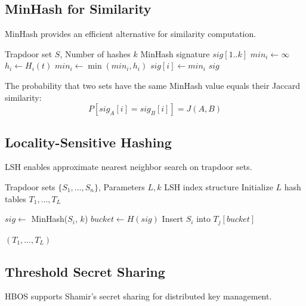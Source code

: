 \documentclass[../main_comprehensive.tex]{subfiles}
\begin{document}
\subsection{MinHash for Similarity}

MinHash provides an efficient alternative for similarity computation.

\begin{algorithm}
\caption{MinHash Signature Generation}
\label{alg:minhash}
\begin{algorithmic}[1]
\REQUIRE Trapdoor set $S$, Number of hashes $k$
\ENSURE MinHash signature $sig[1..k]$
  \STATE $min_i \leftarrow \infty$
    \STATE $h_i \leftarrow H_i(t)$ 
    \STATE $min_i \leftarrow \min(min_i, h_i)$
  \ENDFOR
  \STATE $sig[i] \leftarrow min_i$
\ENDFOR
\RETURN $sig$
\end{algorithmic}
\end{algorithm}

The probability that two sets have the same MinHash value equals their Jaccard similarity:
$$P[sig_A[i] = sig_B[i]] = J(A, B)$$

\subsection{Locality-Sensitive Hashing}

LSH enables approximate nearest neighbor search on trapdoor sets.

\begin{algorithm}
\caption{LSH Indexing}
\label{alg:lsh}
\begin{algorithmic}[1]
\REQUIRE Trapdoor sets $\{S_1, \ldots, S_n\}$, Parameters $L, k$
\ENSURE LSH index structure
\STATE Initialize $L$ hash tables $T_1, \ldots, T_L$

    \STATE $sig \leftarrow$ MinHash($S_i$, $k$) 
    \STATE $bucket \leftarrow H(sig)$ 
    \STATE Insert $S_i$ into $T_j[bucket]$
  \ENDFOR
\ENDFOR

\RETURN $(T_1, \ldots, T_L)$
\end{algorithmic}
\end{algorithm}

\subsection{Threshold Secret Sharing}

HBOS supports Shamir's secret sharing for distributed key management.
\end{document}
